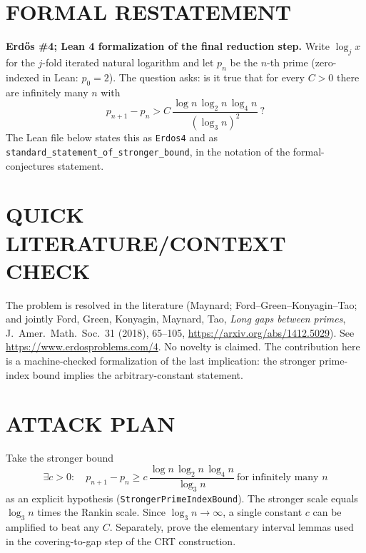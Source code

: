 \section{FORMAL RESTATEMENT}
\textbf{Erd\H{o}s \#4; Lean 4 formalization of the final reduction step.}
Write $\log_j x$ for the $j$-fold iterated natural logarithm and let $p_n$ be the $n$-th prime (zero-indexed in Lean: $p_0=2$). The question asks: is it true that for every $C>0$ there are infinitely many $n$ with
\[
 p_{n+1}-p_n > C\,\frac{\log n\,\log_2 n\,\log_4 n}{(\log_3 n)^2}\ ?
\]
The Lean file below states this as \texttt{Erdos4} and as \texttt{standard\_statement\_of\_stronger\_bound}, in the notation of the formal-conjectures statement.

\section{QUICK LITERATURE/CONTEXT CHECK}
The problem is resolved in the literature (Maynard; Ford--Green--Konyagin--Tao; and jointly Ford, Green, Konyagin, Maynard, Tao, \emph{Long gaps between primes}, J.\ Amer.\ Math.\ Soc.\ 31 (2018), 65--105, \url{https://arxiv.org/abs/1412.5029}). See \url{https://www.erdosproblems.com/4}. No novelty is claimed. The contribution here is a machine-checked formalization of the last implication: the stronger prime-index bound implies the arbitrary-constant statement.

\section{ATTACK PLAN}
Take the stronger bound
\[
 \exists c>0:\quad p_{n+1}-p_n \ge c\,\frac{\log n\,\log_2 n\,\log_4 n}{\log_3 n}\ \text{for infinitely many } n
\]
as an explicit hypothesis (\texttt{StrongerPrimeIndexBound}). The stronger scale equals $\log_3 n$ times the Rankin scale. Since $\log_3 n\to\infty$, a single constant $c$ can be amplified to beat any $C$. Separately, prove the elementary interval lemmas used in the covering-to-gap step of the CRT construction.

